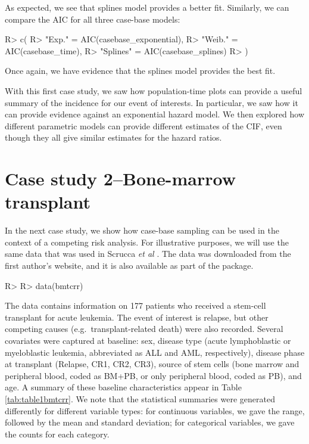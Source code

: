 \documentclass[
]{jss}
\begin{document}
As expected, we see that splines model provides a better fit. Similarly,
we can compare the AIC for all three case-base models:

\begin{CodeChunk}

\begin{CodeInput}
R> c(
R>   "Exp." = AIC(casebase_exponential),
R>   "Weib." = AIC(casebase_time),
R>   "Splines" = AIC(casebase_splines)
R> )
\end{CodeInput}
\end{CodeChunk}

Once again, we have evidence that the splines model provides the best
fit.

With this first case study, we saw how population-time plots can provide
a useful summary of the incidence for our event of interests. In
particular, we saw how it can provide evidence against an exponential
hazard model. We then explored how different parametric models can
provide different estimates of the CIF, even though they all give
similar estimates for the hazard ratios.

\hypertarget{case-study-2bone-marrow-transplant}{%
\section{Case study 2--Bone-marrow
transplant}\label{case-study-2bone-marrow-transplant}}

In the next case study, we show how case-base sampling can be used in
the context of a competing risk analysis. For illustrative purposes, we
will use the same data that was used in Scrucca \emph{et al}
\citeyearpar{scrucca2010regression}. The data was downloaded from the
first author's website, and it is also available as part of the
 package.

\begin{CodeChunk}

\begin{CodeInput}
R> 
R> data(bmtcrr)
\end{CodeInput}
\end{CodeChunk}

The data contains information on 177 patients who received a stem-cell
transplant for acute leukemia. The event of interest is relapse, but
other competing causes (e.g.~transplant-related death) were also
recorded. Several covariates were captured at baseline: sex, disease
type (acute lymphoblastic or myeloblastic leukemia, abbreviated as ALL
and AML, respectively), disease phase at transplant (Relapse, CR1, CR2,
CR3), source of stem cells (bone marrow and peripheral blood, coded as
BM+PB, or only peripheral blood, coded as PB), and age. A summary of
these baseline characteristics appear in Table \ref{tab:table1bmtcrr}.
We note that the statistical summaries were generated differently for
different variable types: for continuous variables, we gave the range,
followed by the mean and standard deviation; for categorical variables,
we gave the counts for each category.
\end{document}
